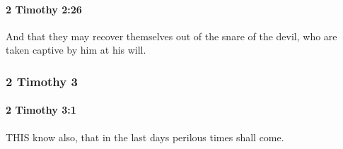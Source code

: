 		\paragraph{2 Timothy 2:26} %
			\label{2TIMOTHY-2-26}

			And that they may recover themselves out of the snare of the devil, who are taken captive by him at his will.

			\begin{framed}
			\scriptsize
				\begin{compactdesc}
					\item[SBLG] 
				\end{compactdesc}
			\end{framed}

	\subsubsection{2 Timothy 3} %
		\label{2TIMOTHY-3}
		
		\paragraph{2 Timothy 3:1} %
			\label{2TIMOTHY-3-1}

			THIS know also, that in the last days perilous times shall come.

